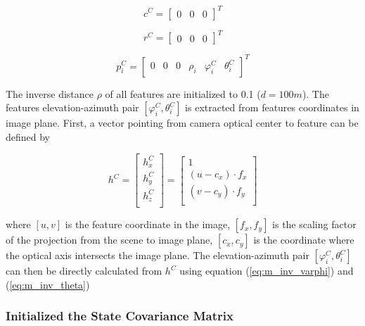 \begin{equation}
c^{C}=\begin{bmatrix}0&0&0\end{bmatrix}^T
\end{equation}

\begin{equation}
r^{C}=\begin{bmatrix}0&0&0\end{bmatrix}^T
\end{equation}

\begin{equation}
p_{i}^{C}=\begin{bmatrix}0&0&0&\rho _{i}&\varphi_{i}^C&\theta_{i}^C\end{bmatrix}^T
\end{equation}

The inverse distance $\rho$ of all features are initialized to 0.1
($d=100m$). The features elevation-azimuth pair $[\varphi _{i}^{C},
\theta _{i}^{C}]$ is extracted from features coordinates in image
plane. First, a vector pointing from camera optical center to feature
can be defined by

\begin{equation}
\label{eq:init_feature_unit_vec}
h^{C}=\begin{bmatrix}
h_{x}^{C}\\
h_{y}^{C}\\
h_{z}^{C}\\
\end{bmatrix}
 = \begin{bmatrix}
1 \\
(u-c_x) \cdot f_{x} \\
(v-c_y) \cdot f_{y} \\
\end{bmatrix}
\end{equation}

\noindent where $[u, v]$ is the feature coordinate in the image, $
[f_{x}, f_{y}]$ is the scaling factor of the projection from the scene
to image plane, $[c_x, c_y]$ is the coordinate where the optical axis
intersects the image plane. The elevation-azimuth pair $[\varphi
_{i}^{C}, \theta _{i}^{C}]$ can then be directly calculated from
$h^{C}$ using equation (\ref{eq:m_inv_varphi}) and (\ref{eq:m_inv_theta})

\subsubsection{Initialized the State Covariance Matrix}


